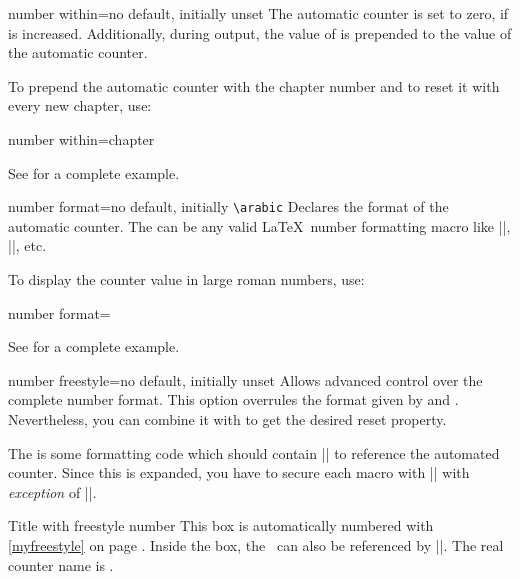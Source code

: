 \clearpage
\begin{newTcbKey}{number within}{=}{no default, initially unset}
The automatic counter is set to zero, if  is increased.
Additionally, during output, the value of  is prepended to the value of
the automatic counter.\par
To prepend the automatic counter with the chapter number and to reset it
with every new chapter, use:
\begin{dispListing}
number within=chapter
\end{dispListing}
See  for a complete example.
\end{newTcbKey}


\begin{newTcbKey}{number format}{=}{no default, initially \texttt{\textbackslash arabic}}
Declares the format of the automatic counter. The  can be
any valid \LaTeX\ number formatting macro like |\arabic|, |\roman|, etc.\par
To display the counter value in large roman numbers, use:
\begin{dispListing}
number format=\Roman
\end{dispListing}
See  for a complete example.
\end{newTcbKey}


\begin{newTcbKey}{number freestyle}{=}{no default, initially unset}
Allows advanced control over the complete number format. This option overrules
the format given by  and .
Nevertheless, you can combine it with  to
get the desired reset property.\par
The  is some formatting code which should contain |\tcbcounter| to
reference the automated counter. Since this  is expanded, you have
to secure each macro with |\noexpand| with \emph{exception} of |\tcbcounter|.


\begin{dispExample}
\begin{phbox}[label={myfreestyle}]{Title with freestyle number}
This box is automatically numbered with \ref{myfreestyle} on page
\pageref{myfreestyle}. Inside the box, the \thetcbcounter\ can
also be referenced by |\thetcbcounter|.
The real counter name is \texttt{\tcbcounter}.
\end{phbox}
\end{dispExample}
\end{newTcbKey}

